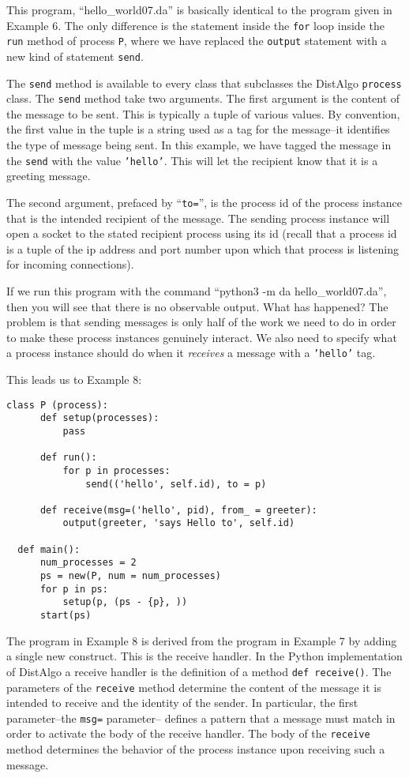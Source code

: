 \documentclass[11pt]{article}
\begin{document}
\noindent This program, ``hello\_world07.da'' is basically identical to the
program given in Example 6. The only difference is the statement inside the
\texttt{for} loop inside the \texttt{run} method of process \texttt{P}, where
we have replaced the \texttt{output} statement with a new kind of statement
\texttt{send}.

The \texttt{send} method is available to every class that subclasses the
DistAlgo \texttt{process} class. The \texttt{send} method take two arguments.
The first argument is the content of the message to be sent. This is typically
a tuple of various values. By convention, the first value in the tuple is a
string used as a tag for the message--it identifies the type of message being
sent. In this example, we have tagged the message in the \texttt{send} with the
value \texttt{'hello'}. This will let the recipient know that it is a greeting
message.

The second argument, prefaced by ``\texttt{to=}'', is the process id of
the process instance that is the intended recipient of the message. The sending
process instance will open a socket to the stated recipient process using its
id (recall that a process id is a tuple of the ip address and port number upon
which that process is listening for incoming connections).

If we run this program with the command ``python3 -m da hello\_world07.da'',
then you will see that there is no observable output. What has happened? The
problem is that sending messages is only half of the work we need to do in
order to make these process instances genuinely interact. We also need to
specify what a process instance should do when it \textit{receives} a message
with a \texttt{'hello'} tag.

This leads us to Example 8:
\begin{lstlisting}[caption={hello\_world08.da - Receive Handler}, label={lst:hw08}]
  class P (process):
      def setup(processes):
          pass

      def run():
          for p in processes:
              send(('hello', self.id), to = p)

      def receive(msg=('hello', pid), from_ = greeter):
          output(greeter, 'says Hello to', self.id)

  def main():
      num_processes = 2
      ps = new(P, num = num_processes)
      for p in ps:
          setup(p, (ps - {p}, ))
      start(ps)
\end{lstlisting}

\noindent The program in Example 8 is derived from the program in Example 7 by adding a
single new construct. This is the receive handler. In the Python implementation
of DistAlgo a receive handler is the definition of a method \texttt{def
  receive()}. The parameters of the \texttt{receive} method determine the
content of the message it is intended to receive and the identity of the
sender. In particular, the first parameter--the \texttt{msg=} parameter--
defines a pattern that a message must match in order to activate the body of
the receive handler. The body of the \texttt{receive} method determines the
behavior of the process instance upon receiving such a message.
\end{document}
